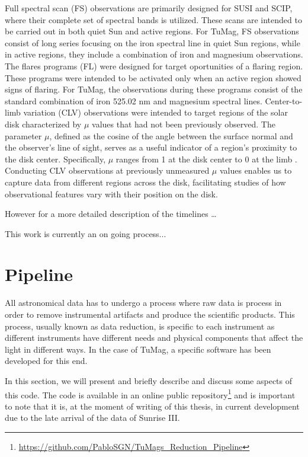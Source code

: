 \begin{itemize}
  \Myitem Full spectral scan (FS) observations are primarily designed for SUSI and SCIP, where their complete set of spectral bands is utilized. These scans are intended to be carried out in both quiet Sun and active regions. For TuMag, FS observations consist of long series focusing on the iron spectral line in quiet Sun regions, while in active regions, they include a combination of iron and magnesium observations.
  \Myitem The flares programs (FL) were designed for target oportunities of a flaring region. These programs were intended to be activated only when an active region showed signs of flaring. For TuMag, the observations during these programs consist of the standard combination of iron 525.02 nm and magnesium spectral lines.
  \Myitem Center-to-limb variation (CLV) observations were intended to target regions of the solar disk characterized by $\mu$ values that had not been previously observed. The parameter $\mu$, defined as the cosine of the angle between the surface normal and the observer's line of sight, serves as a useful indicator of a region's proximity to the disk center. Specifically, $\mu$ ranges from 1 at the disk center to 0 at the limb \citep{thompson2006coordinate}. Conducting CLV observations at previously unmeasured $\mu$ values enables us to capture data from different regions across the disk, facilitating studies of how observational features vary with their position on the disk. 
\end{itemize}

However for a more detailed description of the timelines \dots

This work is currently an on going process... 
\section{Pipeline}

All astronomical data has to undergo a process where raw data is process in order to remove instrumental artifacts and produce the scientific products. This process, usually known as data reduction, is specific to each instrument as different instruments have different needs and physical components that affect the light in different ways. In the case of TuMag, a specific software has been developed for this end.  

In this section, we will present and briefly describe and discuss some aspects of this code. The code is available in an online public repository\footnote{\url{https://github.com/PabloSGN/TuMags_Reduction_Pipeline}} and is important to note that it is, at the moment of writing of this thesis, in current development due to the late arrival of the data of Sunrise III. 

